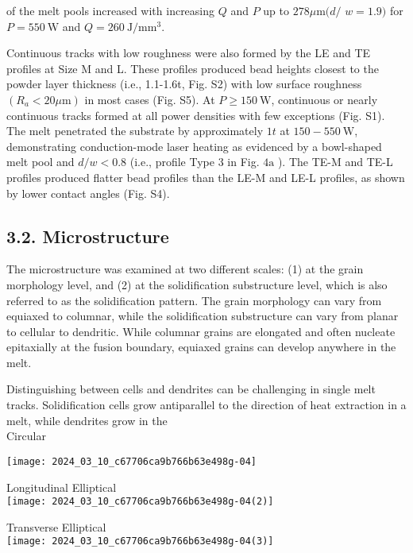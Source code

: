 \documentclass[10pt]{article}
\begin{document}
of the melt pools increased with increasing $Q$ and $P$ up to $278 \mu \mathrm{m}(d /$ $w=1.9)$ for $P=550 \mathrm{~W}$ and $Q=260 \mathrm{~J} / \mathrm{mm}^{3}$.

Continuous tracks with low roughness were also formed by the LE and TE profiles at Size M and L. These profiles produced bead heights closest to the powder layer thickness (i.e., 1.1-1.6t, Fig. S2) with low surface roughness $\left(R_{a}<20 \mu \mathrm{m}\right)$ in most cases (Fig. S5). At $P \geq 150 \mathrm{~W}$, continuous or nearly continuous tracks formed at all power densities with few exceptions (Fig. S1). The melt penetrated the substrate by approximately $1 t$ at $150-550 \mathrm{~W}$, demonstrating conduction-mode laser heating as evidenced by a bowl-shaped melt pool and $d / w<0.8$ (i.e., profile Type 3 in Fig. $4 \mathrm{a}$ ). The TE-M and TE-L profiles produced flatter bead profiles than the LE-M and LE-L profiles, as shown by lower contact angles (Fig. S4).

\subsection*{3.2. Microstructure}
The microstructure was examined at two different scales: (1) at the grain morphology level, and (2) at the solidification substructure level, which is also referred to as the solidification pattern. The grain morphology can vary from equiaxed to columnar, while the solidification substructure can vary from planar to cellular to dendritic. While columnar grains are elongated and often nucleate epitaxially at the fusion boundary, equiaxed grains can develop anywhere in the melt.

Distinguishing between cells and dendrites can be challenging in single melt tracks. Solidification cells grow antiparallel to the direction of heat extraction in a melt, while dendrites grow in the\\
Circular

\begin{center}
\texttt{[image: 2024\_03\_10\_c67706ca9b766b63e498g-04]}
\end{center}

Longitudinal Elliptical\\
\texttt{[image: 2024\_03\_10\_c67706ca9b766b63e498g-04(2)]}

Transverse Elliptical\\
\texttt{[image: 2024\_03\_10\_c67706ca9b766b63e498g-04(3)]}
\end{document}
